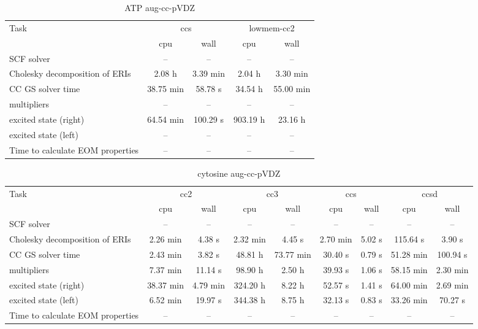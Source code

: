 \documentclass{article}
\begin{document}
\begin{table}
\caption{ATP aug-cc-pVDZ}
\begin{tabular}{lcccc}
\toprule
Task & \multicolumn{2}{c}{ccs} & \multicolumn{2}{c}{lowmem-cc2}\\
\cmidrule(lr){2-3}\cmidrule(lr){4-5}
 & cpu & wall & cpu & wall\\
\midrule
SCF solver & -- & -- & -- & --\\
Cholesky decomposition of ERIs & 2.08 h & 3.39 min & 2.04 h & 3.30 min\\
CC GS solver time & 38.75 min & 58.78 s & 34.54 h & 55.00 min\\
multipliers & -- & -- & -- & --\\
excited state (right) & 64.54 min & 100.29 s & 903.19 h & 23.16 h\\
excited state (left) & -- & -- & -- & --\\
Time to calculate EOM properties & -- & -- & -- & --\\
\bottomrule
\end{tabular}
\end{table}
\begin{table}
\caption{cytosine aug-cc-pVDZ}
\begin{tabular}{lcccccccc}
\toprule
Task & \multicolumn{2}{c}{cc2} & \multicolumn{2}{c}{cc3} & \multicolumn{2}{c}{ccs} & \multicolumn{2}{c}{ccsd}\\
\cmidrule(lr){2-3}\cmidrule(lr){4-5}\cmidrule(lr){6-7}\cmidrule(lr){8-9}
 & cpu & wall & cpu & wall & cpu & wall & cpu & wall\\
\midrule
SCF solver & -- & -- & -- & -- & -- & -- & -- & --\\
Cholesky decomposition of ERIs & 2.26 min & 4.38 s & 2.32 min & 4.45 s & 2.70 min & 5.02 s & 115.64 s & 3.90 s\\
CC GS solver time & 2.43 min & 3.82 s & 48.81 h & 73.77 min & 30.40 s & 0.79 s & 51.28 min & 100.94 s\\
multipliers & 7.37 min & 11.14 s & 98.90 h & 2.50 h & 39.93 s & 1.06 s & 58.15 min & 2.30 min\\
excited state (right) & 38.37 min & 4.79 min & 324.20 h & 8.22 h & 52.57 s & 1.41 s & 64.00 min & 2.69 min\\
excited state (left) & 6.52 min & 19.97 s & 344.38 h & 8.75 h & 32.13 s & 0.83 s & 33.26 min & 70.27 s\\
Time to calculate EOM properties & -- & -- & -- & -- & -- & -- & -- & --\\
\bottomrule
\end{tabular}
\end{table}
\end{document}
